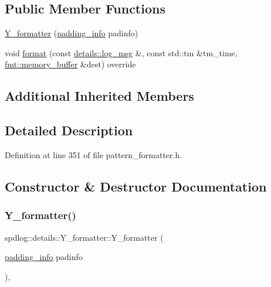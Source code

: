 \subsection*{Public Member Functions}
\begin{DoxyCompactItemize}
\item 
\hyperlink{classspdlog_1_1details_1_1_y__formatter_ac720d56ae2b7f315bcb788505f6f0b32}{Y\+\_\+formatter} (\hyperlink{structspdlog_1_1details_1_1padding__info}{padding\+\_\+info} padinfo)
\item 
void \hyperlink{classspdlog_1_1details_1_1_y__formatter_a0a05d2970b7558f0e24336fdc05e504a}{format} (const \hyperlink{structspdlog_1_1details_1_1log__msg}{details\+::log\+\_\+msg} \&, const std\+::tm \&tm\+\_\+time, \hyperlink{format_8h_a21cbf729f69302f578e6db21c5e9e0d2}{fmt\+::memory\+\_\+buffer} \&dest) override
\end{DoxyCompactItemize}
\subsection*{Additional Inherited Members}


\subsection{Detailed Description}


Definition at line 351 of file pattern\+\_\+formatter.\+h.



\subsection{Constructor \& Destructor Documentation}
\mbox{\label{classspdlog_1_1details_1_1_y__formatter_ac720d56ae2b7f315bcb788505f6f0b32}} 
\subsubsection{\texorpdfstring{Y\+\_\+formatter()}{Y\_formatter()}}
{\footnotesize\ttfamily spdlog\+::details\+::\+Y\+\_\+formatter\+::\+Y\+\_\+formatter (\begin{DoxyParamCaption}\item[{\hyperlink{structspdlog_1_1details_1_1padding__info}{padding\+\_\+info}}]{padinfo }\end{DoxyParamCaption})\hspace{0.3cm}{\ttfamily [inline]}, {\ttfamily [explicit]}}



